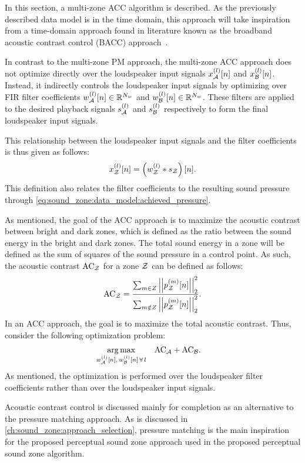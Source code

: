 In this section, a multi-zone ACC algorithm is described.
As the previously described data model is in the time domain, this approach will take inspiration from a time-domain approach found in literature known as the
broadband acoustic contrast control (BACC) approach~\cite{elliott2011regularisation, cai2014time, moller2016sound}.

In contrast to the multi-zone PM approach, the multi-zone ACC approach does not optimize directly over 
the loudspeaker input signals $x_{\mathcal{A}}^{(l)}[n]$ and $x_{\mathcal{B}}^{(l)}[n]$.
Instead, it indirectly controls the loudspeaker input signals by optimizing over 
FIR filter coefficients $w_{\mathcal{A}}^{(l)}[n]\in\mathbb{R}^{N_w}$ and $w_{\mathcal{B}}^{(l)}[n]\in\mathbb{R}^{N_w}$.
These filters are applied to the desired playback signals $s_{\mathcal{A}}^{(l)}$ and $s_{\mathcal{B}}^{(l)}$ 
respectively to form the final loudspeaker input signals.

This relationship between the loudspeaker input signals and the filter coefficients is thus given as follows:
\begin{equation}
    x_{\mathcal{Z}}^{(l)}[n] = \left(w_{\mathcal{Z}}^{(l)} \ast s_{\mathcal{Z}}\right)[n].
\end{equation}
This definition also relates the filter coefficients to the resulting sound pressure 
through \autoref{eq:sound_zone:data_model:achieved_pressure}.

As mentioned, the goal of the ACC approach is to maximize the acoustic contrast between bright and dark zones,
which is defined as the ratio between the sound energy in the bright and dark zones.
The total sound energy in a zone will be defined as the sum of squares of the sound pressure in a control point.
As such, the acoustic contrast $\text{AC}_{\mathcal{Z}}$ for a zone $\mathcal{Z}$ can be defined as follows: 
\begin{equation}
    \text{AC}_{\zz} = \frac{\sum_{m\in Z} \norm[2][2]{p_\zz^{(m)}[n]}}{\sum_{m\notin Z} \norm[2][2]{p_\zz^{(m)}[n]}}.
\end{equation}
In an ACC approach, the goal is to maximize the total acoustic contrast.
Thus, consider the following optimization problem:
\begin{align}
    \operatorname*{arg\,max}_{w_{\mathcal{A}}^{(l)}[n],\,w_{\mathcal{B}}^{(l)}[n]\,\forall\,l}\quad 
       &\text{AC}_{\mathcal{A}} + \text{AC}_{\mathcal{B}}
   .
\end{align}
As mentioned, the optimization is performed over the loudspeaker filter coefficients rather than over the loudspeaker input signals.

Acoustic contrast control is discussed mainly for completion as an alternative to the pressure matching approach.
As is discussed in \autoref{ch:sound_zone:approach_selection}, 
pressure matching is the main inspiration for the proposed perceptual sound zone approach used in the proposed perceptual sound zone algorithm.
